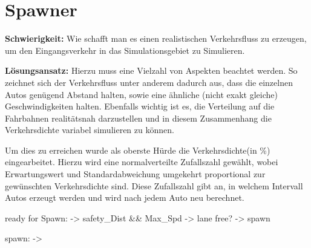 \section{Spawner}
\textbf{Schwierigkeit:} Wie schafft man es einen realistischen Verkehrsfluss zu erzeugen, um den Eingangsverkehr in das Simulationsgebiet zu Simulieren.
\begin{addmargin}[25pt]{0pt}
	\item \textbf{Lösungsansatz:} Hierzu muss eine Vielzahl von Aspekten beachtet werden. So zeichnet sich der Verkehrsfluss unter anderem dadurch aus, dass die einzelnen Autos genügend Abstand halten, sowie eine ähnliche (nicht exakt gleiche) Geschwindigkeiten halten. Ebenfalls wichtig ist es, die Verteilung auf die Fahrbahnen realitätsnah darzustellen und in diesem Zusammenhang die Verkehrsdichte variabel simulieren zu können.
	
	Um dies zu erreichen wurde als oberste Hürde die Verkehrsdichte(in \%) eingearbeitet. Hierzu wird eine normalverteilte Zufallszahl gewählt, wobei Erwartungswert und Standardabweichung umgekehrt proportional zur gewünschten Verkehrsdichte sind. Diese Zufallszahl gibt an, in welchem Intervall Autos erzeugt werden und wird nach jedem Auto neu berechnet. 
	
	ready for Spawn:
			-> safety_Dist \&\& Max_Spd
			-> lane free?
			-> spawn
	
	spawn: 
			-> 		
\end{addmargin}


